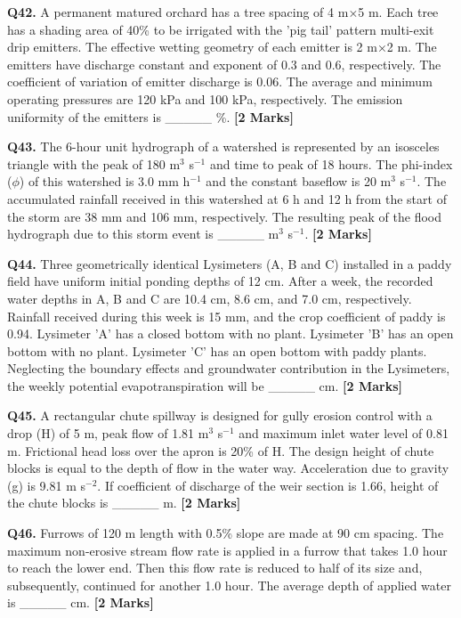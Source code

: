 \documentclass[11pt]{article}
\newcommand{\questionb}[2]{
    \noindent\textbf{Q#2.} #1 \hfill \textbf{[2 Marks]}
}
\begin{document}
\questionb{A permanent matured orchard has a tree spacing of 4 m×5 m. Each tree has a shading area of 40\% to be irrigated with the 'pig tail' pattern multi-exit drip emitters. The effective wetting geometry of each emitter is 2 m×2 m. The emitters have discharge constant and exponent of 0.3 and 0.6, respectively. The coefficient of variation of emitter discharge is 0.06. The average and minimum operating pressures are 120 kPa and 100 kPa, respectively. The emission uniformity of the emitters is \_\_\_\_\_ \%.}{42}
\vspace{0.5cm}

\questionb{The 6-hour unit hydrograph of a watershed is represented by an isosceles triangle with the peak of 180 m\(^3\) s\(^{-1}\) and time to peak of 18 hours. The phi-index (\(\phi\)) of this watershed is 3.0 mm h\(^{-1}\) and the constant baseflow is 20 m\(^3\) s\(^{-1}\). The accumulated rainfall received in this watershed at 6 h and 12 h from the start of the storm are 38 mm and 106 mm, respectively. The resulting peak of the flood hydrograph due to this storm event is \_\_\_\_\_ m\(^3\) s\(^{-1}\).}{43}
\vspace{0.5cm}

\questionb{Three geometrically identical Lysimeters (A, B and C) installed in a paddy field have uniform initial ponding depths of 12 cm. After a week, the recorded water depths in A, B and C are 10.4 cm, 8.6 cm, and 7.0 cm, respectively. Rainfall received during this week is 15 mm, and the crop coefficient of paddy is 0.94. Lysimeter 'A' has a closed bottom with no plant. Lysimeter 'B' has an open bottom with no plant. Lysimeter 'C' has an open bottom with paddy plants. Neglecting the boundary effects and groundwater contribution in the Lysimeters, the weekly potential evapotranspiration will be \_\_\_\_\_ cm.}{44}
\vspace{0.5cm}

\questionb{A rectangular chute spillway is designed for gully erosion control with a drop (H) of 5 m, peak flow of 1.81 m\(^3\) s\(^{-1}\) and maximum inlet water level of 0.81 m. Frictional head loss over the apron is 20\% of H. The design height of chute blocks is equal to the depth of flow in the water way. Acceleration due to gravity (g) is 9.81 m s\(^{-2}\). If coefficient of discharge of the weir section is 1.66, height of the chute blocks is \_\_\_\_\_ m.}{45}
\vspace{0.5cm}

\questionb{Furrows of 120 m length with 0.5\% slope are made at 90 cm spacing. The maximum non-erosive stream flow rate is applied in a furrow that takes 1.0 hour to reach the lower end. Then this flow rate is reduced to half of its size and, subsequently, continued for another 1.0 hour. The average depth of applied water is \_\_\_\_\_ cm.}{46}
\vspace{0.5cm}
\end{document}
